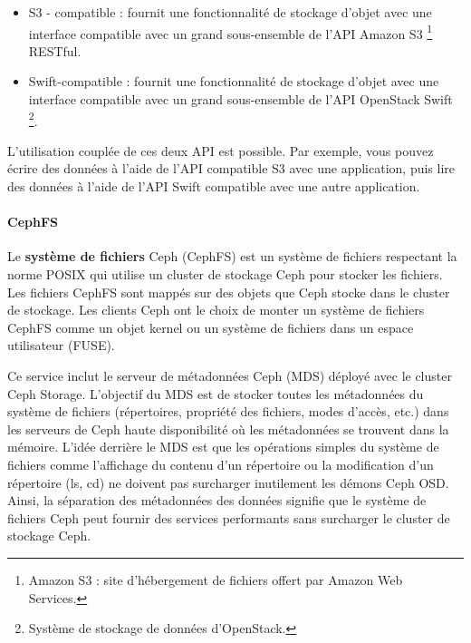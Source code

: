 \begin{itemize}
\item S3 - compatible : fournit une fonctionnalité de stockage d'objet avec une interface compatible avec un grand sous-ensemble de l'API Amazon S3 \footnote{Amazon S3 : site d'hébergement de fichiers offert par Amazon Web Services.} RESTful.
\item Swift-compatible : fournit une fonctionnalité de stockage d'objet avec une interface compatible avec un grand sous-ensemble de l'API OpenStack Swift \footnote{Système de stockage de données d'OpenStack.}.
\end{itemize}

L'utilisation couplée de ces deux API est possible. Par exemple, vous pouvez écrire des données à l'aide de l'API compatible S3 avec une application, puis lire des données à l'aide de l'API Swift compatible avec une autre application.

\paragraph{CephFS}

Le \textbf{système de fichiers} Ceph (CephFS) est un système de fichiers respectant la norme POSIX qui utilise un cluster de stockage Ceph pour stocker les fichiers. Les fichiers CephFS sont mappés sur des objets que Ceph stocke dans le cluster de stockage. Les clients Ceph ont le choix de monter un système de fichiers CephFS comme un objet kernel ou un système de fichiers dans un espace utilisateur (FUSE).

Ce service inclut le serveur de métadonnées Ceph (MDS) déployé avec le cluster Ceph Storage. L'objectif du MDS est de stocker toutes les métadonnées du système de fichiers (répertoires, propriété des fichiers, modes d'accès, etc.) dans les serveurs de Ceph haute disponibilité où les métadonnées se trouvent dans la mémoire. L'idée derrière le MDS est que les opérations simples du système de fichiers comme l'affichage du contenu d'un répertoire ou la modification d'un répertoire (ls, cd) ne doivent pas surcharger inutilement les démons Ceph OSD. Ainsi, la séparation des métadonnées des données signifie que le système de fichiers Ceph peut fournir des services performants sans surcharger le cluster de stockage Ceph.
